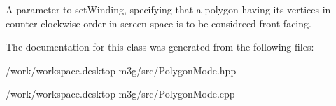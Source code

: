 A parameter to setWinding, specifying that a polygon having its vertices in counter-clockwise order in screen space is to be considreed front-facing. 

The documentation for this class was generated from the following files:\begin{CompactItemize}
\item 
/work/workspace.desktop-m3g/src/PolygonMode.hpp\item 
/work/workspace.desktop-m3g/src/PolygonMode.cpp\end{CompactItemize}
